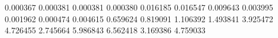 0.000367
0.000381
0.000381
0.000380
0.016185
0.016547
0.009643
0.003995
0.001962
0.000474
0.004615
0.659624
0.819091
1.106392
1.493841
3.925472
4.726455
2.745664
5.986843
6.562418
3.169386
4.759033

